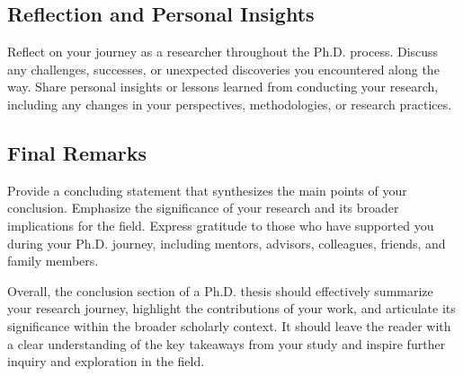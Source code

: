     
\subsection{Reflection and Personal Insights}
Reflect on your journey as a researcher throughout the Ph.D. process.
Discuss any challenges, successes, or unexpected discoveries you encountered along the way.
Share personal insights or lessons learned from conducting your research, including any changes in your perspectives, methodologies, or research practices.
    
    
\subsection{Final Remarks}
Provide a concluding statement that synthesizes the main points of your conclusion.
Emphasize the significance of your research and its broader implications for the field.
Express gratitude to those who have supported you during your Ph.D. journey, including mentors, advisors, colleagues, friends, and family members.

Overall, the conclusion section of a Ph.D. thesis should effectively summarize your research journey, highlight the contributions of your work, and articulate its significance within the broader scholarly context.
It should leave the reader with a clear understanding of the key takeaways from your study and inspire further inquiry and exploration in the field.
